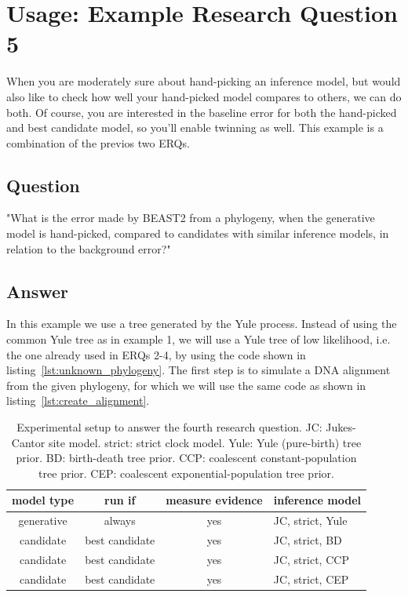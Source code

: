 \documentclass{article}
\begin{document}
\section{Usage: Example Research Question 5}

When you are moderately sure about hand-picking an inference model,
but would also like to check how well your hand-picked model compares
to others, we can do both. Of course, you are interested in the
baseline error for both the hand-picked and best candidate model,
so you'll enable twinning as well. This example is a combination
of the previos two ERQs. 

\subsection{Question}

"What is the error made by BEAST2 from a phylogeny, 
when the generative model is hand-picked, 
compared to candidates with similar inference models, 
in relation to the background error?"

\subsection{Answer}

In this example we use a tree generated by the Yule process.
Instead of using the common Yule tree as in example 1, we will use
a Yule tree of low likelihood, 
i.e. the one already used in ERQs 2-4, 
by using the code shown in listing~\ref{lst:unknown_phylogeny}.
The first step is to simulate a DNA alignment 
from the given phylogeny, for which we will use the same code 
as shown in listing~\ref{lst:create_alignment}.

\begin{table}
  \begin{tabular}{ | c | c | c | l | }
    \hline
    \textbf{model type} & \textbf{run if} & \textbf{measure evidence} & 
\textbf{inference model} \\ 
    \hline
    generative & always         & yes & JC, strict, Yule \\
    candidate  & best candidate & yes & JC, strict, BD \\
    candidate  & best candidate & yes & JC, strict, CCP \\
    candidate  & best candidate & yes & JC, strict, CEP \\
    \hline
  \end{tabular}
  \caption{
    Experimental setup to answer the fourth research question.
    JC: Jukes-Cantor site model.
    strict: strict clock model.
    Yule: Yule (pure-birth) tree prior.
    BD: birth-death tree prior.
    CCP: coalescent constant-population tree prior.
    CEP: coalescent exponential-population tree prior.
  }
  \label{tab:experiment_5}
\end{table}
\end{document}
